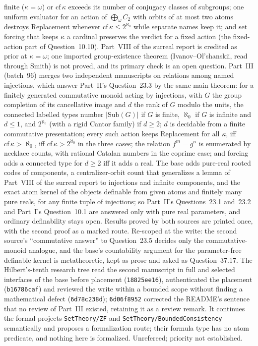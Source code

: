 \documentclass[11pt]{article}
\newcommand{\dir}[1]{\texttt{#1}}
\begin{document}
{finite ($\kappa=\omega$) or $\mathrm{cf}\,\kappa$ exceeds its number of
conjugacy classes of subgroups; one uniform evaluator for an action of
$\bigoplus_\omega C_2$ with orbits of at most two atoms destroys
Replacement whenever $\mathrm{cf}\,\kappa\le2^{\aleph_0}$ while separate
names keep it; and set forcing that keeps $\kappa$ a cardinal preserves the
verdict for a fixed action (the fixed-action part of Question~10.10).  Part~VIII
of the surreal report is credited as prior at $\kappa=\omega$; one imported
group-existence theorem (Ivanov--Ol'shanskii, read through Smith) is not
proved, and its primary check is an open question.  Part~III (batch~96)
merges two independent manuscripts on relations among named injections,
which answer Part~II's Question~23.3 by the same main theorem: for a finitely
generated commutative monoid acting by injections, with $G$ the group
completion of its cancellative image and $d$ the rank of $G$ modulo the
units, the connected labelled types number $|\mathrm{Sub}(G)|$ if $G$ is
finite, $\aleph_0$ if $G$ is infinite and $d\le1$, and $2^{\aleph_0}$ (with
a rigid Cantor family) if $d\ge2$; $d$ is decidable from a finite
commutative presentation; every such action keeps Replacement for all
$\kappa$, iff $\mathrm{cf}\,\kappa>\aleph_0$, iff
$\mathrm{cf}\,\kappa>2^{\aleph_0}$ in the three cases; the relation
$f^m=g^n$ is enumerated by necklace counts, with rational Catalan numbers
in the coprime case; and forcing adds a connected type for $d\ge2$ iff it
adds a real.  The base adds pure-real rooted codes of components, a
centralizer-orbit count that generalizes a lemma of Part~VIII of the
surreal report to injections and infinite components, and the exact atom
kernel of the objects definable from given atoms and finitely many pure
reals, for any finite tuple of injections; so Part~II's Questions~23.1
and~23.2 and Part~I's Question~10.1 are answered only with pure real
parameters, and ordinary definability stays open.  Results proved by both
sources are printed once, with the second proof as a marked route.
Re-scoped at the write: the second source's ``commutative answer'' to
Question~23.5 decides only the commutative-monoid analogue, and the base's
countability argument for the parameter-free definable kernel is
metatheoretic, kept as prose and asked as Question~37.17.  The
Hilbert's-tenth research tree read the second manuscript in full and
selected interfaces of the base before placement (\texttt{18825ee16}),
authenticated the placement (\texttt{b16786caf}) and reviewed the write
within a bounded scope without finding a mathematical defect
(\texttt{6d78c238d}); \texttt{6d06f8952} corrected the README's sentence
that no review of Part~III existed, retaining it as a review remark.  It continues
the formal projects \dir{SetTheory/ZF} and \dir{SetTheory/BoundedConsistency}
semantically and proposes a formalization route; their formula type has no
atom predicate, and nothing here is formalized.  Unrefereed; priority not
established.}
\end{document}
